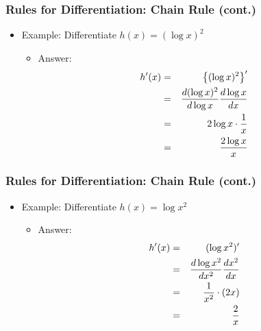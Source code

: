 \documentclass[pdflatex, 12pt]{beamer}
\begin{document}
\begin{frame}
\frametitle{Rules for Differentiation: Chain Rule (cont.)}
\begin{itemize}
\item Example: Differentiate $h(x) = (\log x)^2$
\vspace{0.4cm}
 \begin{itemize}
 \item Answer: 
  \begin{eqnarray}
  h'(x) &=& \left\{(\log x)^2\right\}' \notag \\
  &=& \frac{d(\log x)^2}{d\log x} \frac{d\log x}{dx} \notag \\
  &=& 2\log x \cdot \frac{1}{x} \notag \\
  &=& \frac{2\log x}{x} \notag 
  \end{eqnarray}
 \end{itemize}
\end{itemize}
\end{frame}

\begin{frame}
\frametitle{Rules for Differentiation: Chain Rule (cont.)}
\begin{itemize}
\item Example: Differentiate $h(x) = \log x^2$
\vspace{0.4cm}
 \begin{itemize}
 \item Answer: 
  \begin{eqnarray}
  h'(x) &=& (\log x^2)' \notag \\
  &=& \frac{d\log x^2}{dx^2} \frac{dx^2}{dx} \notag \\
  &=& \frac{1}{x^2} \cdot (2x) \notag \\
  &=& \frac{2}{x} \notag
  \end{eqnarray}
 \end{itemize}
\end{itemize}
\end{frame}
\end{document}
